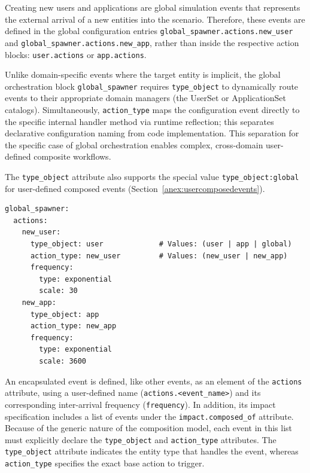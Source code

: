 \documentclass[ASNA]{USG} %
\begin{document}
\label{anex_globalevents}

Creating new users and applications are global simulation events that represents the external arrival of a new entities into the scenario. Therefore, these events are defined in the global configuration entries \texttt{global\_spawner.actions.new\_user} and \texttt{global\_spawner.actions.new\_app}, rather than inside the respective action blocks: \texttt{user.actions} or \texttt{app.actions}.

Unlike domain-specific events where the target entity is implicit, the global orchestration block \texttt{global\_spawner} requires \texttt{type\_object} to dynamically route events to their appropriate domain managers (the UserSet or ApplicationSet catalogs). Simultaneously, \texttt{action\_type} maps the configuration event directly to the specific internal handler method via runtime reflection; this separates declarative configuration naming from code implementation. This separation for the specific case of global orchestration enables complex, cross-domain user-defined composite workflows.

The \texttt{type\_object} attribute also supports the special value \texttt{type\_object:global} for user-defined composed events (Section~\ref{anex:usercomposedevents}).


\begin{lstlisting}[caption={YAML configuration for global entity creation events},label=lst:global_spawner_yaml, basicstyle=\fontsize{8}{10}\selectfont\ttfamily]
global_spawner:
  actions:
    new_user:
      type_object: user             # Values: (user | app | global)
      action_type: new_user         # Values: (new_user | new_app)
      frequency:
        type: exponential
        scale: 30
    new_app:
      type_object: app
      action_type: new_app
      frequency:
        type: exponential
        scale: 3600
\end{lstlisting}





\label{anex:usercomposedevents}

An encapsulated event is defined, like other events, as an element of the \texttt{actions} attribute, using a user-defined name (\texttt{actions.<event\_name>}) and its corresponding inter-arrival frequency (\texttt{frequency}). In addition, its impact specification includes a list of events under the \texttt{impact.composed\_of} attribute. Because of the generic nature of the composition model, each event in this list must explicitly declare the \texttt{type\_object} and \texttt{action\_type} attributes. The \texttt{type\_object} attribute indicates the entity type that handles the event, whereas \texttt{action\_type} specifies the exact base action to trigger. 
\end{document}
